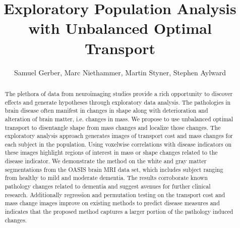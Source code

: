 \documentclass{llncs}
\begin{document}
\title{Exploratory Population Analysis with Unbalanced Optimal Transport}

\author{Samuel Gerber, Marc Niethammer, Martin Styner, Stephen Aylward}


\maketitle              




\begin{abstract}
The plethora of data from neuroimaging studies provide a rich opportunity to
discover effects and generate hypotheses through exploratory data analysis. The
pathologies in brain disease often manifest in changes in shape along with
deterioration and alteration of brain matter, i.e. changes in mass. We propose
to use unbalanced optimal transport to disentangle shape from mass changes and
localize those changes. The exploratory analysis approach generates images of
transport cost and mass changes for each subject in the population.  Using
voxelwise correlations with disease indicators on these images highlight
regions of interest in mass or shape changes related to the disease indicator.
We demonstrate the method on the white and gray matter segmentations from the
OASIS brain MRI data set, which includes subject ranging from healthy to mild
and moderate dementia. The results corroborate known pathology changes related
to dementia and suggest avenues for further clinical research. Additionally
regression and permutation testing on the transport cost and mass change images
improve on existing methods to predict disease measures and indicates that the
proposed method captures a larger portion of the pathology induced changes.  
\end{abstract}
\end{document}
